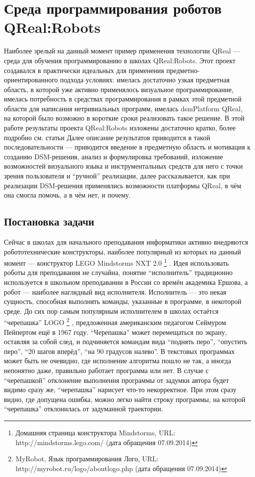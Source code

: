 \section{Среда программирования роботов QReal:Robots}
\label{chapter:qRealRobots}
Наиболее зрелый на данный момент пример применения технологии QReal --- среда для 
обучения программированию в школах QReal:Robots. Этот проект создавался в практически 
идеальных для применения предметно-ориентированного подхода условиях: имелась достаточно 
узкая предметная область, в которой уже активно применялось визуальное программирование, 
имелась потребность в средствах программирования в рамках этой предметной области для 
написания нетривиальных программ, имелась \ac{dsmPlatform} QReal, на которой было возможно 
в короткие сроки реализовать такое решение. В этой работе результаты проекта QReal:Robots изложены достаточно кратко, более подробно см. статьи
\cite{bryksin2011robots, tikhonova2012robots, litvinov2012robots, terekhov2013robots}
Далее описание результатов приводится в такой последовательности --- приводится введение 
в предметную область и мотивация к созданию \ac{DSM}-решения, анализ и формулировка требований, 
изложение возможностей визуального языка и инструментальных средств для него с точки 
зрения пользователя и "`ручной"' реализации, далее рассказывается, как при реализации 
\ac{DSM}-решения применялись возможности платформы QReal, в чём она смогла помочь, а в чём нет, и почему.

\subsection{Постановка задачи}
Сейчас в школах для начального преподавания информатики активно внедряются робототехнические 
конструкторы, наиболее популярный из которых на данный момент --- конструктор LEGO Mindstorms NXT 2.0%
\footnote{Домашняя страница конструктора Mindstorms, URL: http://mindstorms.lego.com/ (дата обращения 07.09.2014)}%
. Идея использовать роботы для преподавания не случайна, понятие "`исполнитель"' традиционно 
используется в школьном преподавании в России со времён академика Ершова, а робот --- наиболее 
наглядный вид исполнителя. Исполнитель --- это некая сущность, способная выполнять 
команды, указанные в программе, в некоторой среде. До сих пор самым популярным исполнителем 
в школах остаётся "`черепашка"' LOGO%
\footnote{MyRobot, Язык программирования Лого, URL: http://myrobot.ru/logo/aboutlogo.php (дата обращения 07.09.2014)}%
, предложенная американским педагогом Сеймуром Пейпертом ещё в 1967 году. "`Черепашка"' 
может перемещаться по экрану, оставляя за собой след, и подчиняется командам вида "`поднять перо"', 
"`опустить перо"', "`20 шагов вперёд"', "`на 90 градусов налево"'. В текстовых программах 
может быть не очевидно, где исполнение алгоритма пошло не так, а иногда непонятно 
даже, правильно работает программа или нет. В случае с "`черепашкой"' отклонение выполнения 
программы от задумки автора будет видимо сразу же, "`черепашка"' нарисует что-то некорректное. 
При этом сразу видно, где допущена ошибка, можно легко найти строку программы, на 
которой "`черепашка"' отклонилась от задуманной траектории.

